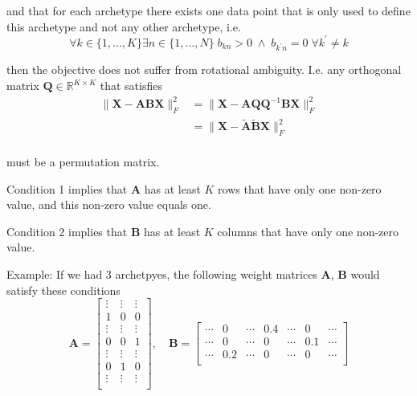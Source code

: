 \documentclass[oneside]{article}
\begin{document}
and that for each archetype there exists one data point that is only used to define this archetype and not any other archetype, i.e.
\begin{equation}
    \label{eq:cond2_}
    \forall k \in \{1, ..., K\} \exists n \in \{1, ..., N\} \; b_{k n} > 0 \; \land \; b_{k^\prime n} = 0 \; \forall k^\prime \neq k
\end{equation}

then the objective does not suffer from rotational ambiguity. I.e. any orthogonal matrix $\mathbf{Q} \in \mathbb{R}^{K \times K}$ that satisfies
\begin{equation}
    \begin{aligned}
    \| \mathbf{X} - \mathbf{A} \mathbf{B} \mathbf{X}\|_F^2
    &= \| \mathbf{X} - \mathbf{A} \mathbf{Q} \mathbf{Q}^{-1} \mathbf{B} \mathbf{X}\|_F^2 \\
    &= \| \mathbf{X} - \tilde{\mathbf{A}} \tilde{\mathbf{B}} \mathbf{X}\|_F^2 \\
    \end{aligned}
\end{equation}

must be a permutation matrix.

Condition 1 implies that $\mathbf{A}$ has at least $K$ rows that have only one non-zero value, and this non-zero value equals one.

Condition 2 implies that $\mathbf{B}$ has at least $K$ columns that have only one non-zero value.

Example: If we had $3$ archetpyes, the following weight matrices $\mathbf{A}$, $\mathbf{B}$ would satisfy these conditions
\begin{equation}
    \mathbf{A} =
    \left[
        \begin{array}{ccc}
            \vdots & \vdots & \vdots \\
            1 & 0 & 0 \\
            \vdots & \vdots & \vdots \\
            0 & 0 & 1 \\
            \vdots & \vdots & \vdots \\
            0 & 1 & 0 \\
            \vdots & \vdots & \vdots \\
        \end{array}
    \right]
    , \quad
    \mathbf{B} =
    \left[
        \begin{array}{ccccccc}
            \cdots & 0 & \cdots & 0.4 & \cdots & 0 & \cdots \\
            \cdots & 0 & \cdots & 0 & \cdots & 0.1 & \cdots \\
            \cdots & 0.2 & \cdots & 0 & \cdots & 0 & \cdots \\
        \end{array}
    \right]
\end{equation}
\end{document}
